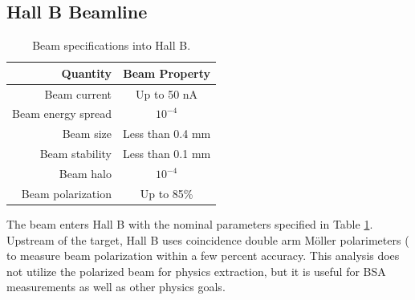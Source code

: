     \clearpage
    \subsection{Hall B Beamline}

        \begin{table}[h]
                \centering
                \begin{tabular}{rc}
                    Quantity  & Beam Property \\\hline
                    Beam current  & Up to 50 nA \\
                    Beam energy spread  & $10^{-4}$ \\
                    Beam size  & Less than 0.4 mm \\
                    Beam stability  & Less than 0.1 mm \\
                    Beam halo & $10^{-4}$ \\
                    Beam polarization & Up to 85\% \\
                \end{tabular}
            \caption{Beam specifications into Hall B.}
            \label{table:beam-properties}
        \end{table}
        
        The beam enters Hall B with the nominal parameters specified in Table \ref{table:beam-properties}. Upstream of the target, Hall B uses coincidence double arm M\"oller polarimeters ( to measure beam polarization within a few percent accuracy. This analysis does not utilize the polarized beam for physics extraction, but it is useful for BSA measurements as well as other physics goals. 
    
